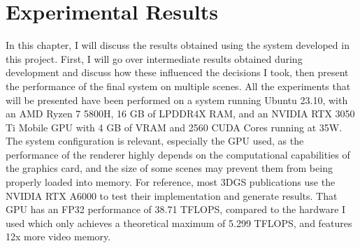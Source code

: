 \section{Experimental Results}

In this chapter, I will discuss the results obtained using the system developed in this project. First, I will go over intermediate results obtained during development and discuss how these influenced the decisions I took, then present the performance of the final system on multiple scenes. All the experiments that will be presented have been performed on a system running Ubuntu 23.10, with an AMD Ryzen 7 5800H, 16 GB of LPDDR4X RAM, and an NVIDIA RTX 3050 Ti Mobile GPU with 4 GB of VRAM and 2560 CUDA Cores running at 35W. The system configuration is relevant, especially the GPU used, as the performance of the renderer highly depends on the computational capabilities of the graphics card, and the size of some scenes may prevent them from being properly loaded into memory. For reference, most 3DGS publications use the NVIDIA RTX A6000 to test their implementation and generate results. That GPU has an FP32 performance of 38.71 TFLOPS, compared to the hardware I used which only achieves a theoretical maximum of 5.299 TFLOPS, and features 12x more video memory.